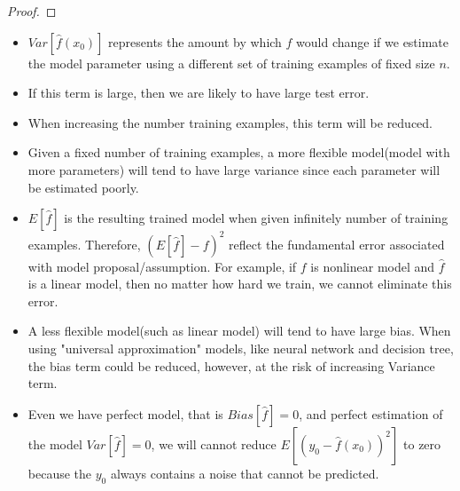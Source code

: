 \begin{refsection}
\begin{proof}
\end{proof}



\begin{remark}\hfill
\begin{itemize}
	\item $Var[\hat{f}(x_0)]$ represents the amount by which $\hat{f}$ would change if we estimate the model parameter using a different set of training examples of fixed size $n$. 
	\item If this term is large, then we are likely to have large test error.
	\item When increasing the number training examples, this term will be reduced. 
	\item Given a fixed number of training examples, a more flexible model(model with more parameters) will tend to have large variance since each parameter will be estimated poorly.
\end{itemize}
\end{remark}

\begin{remark}\hfill
	\begin{itemize}
		\item $E[\hat{f}]$ is the resulting trained model when given infinitely number of training examples. Therefore, $(E[\hat{f}] - f)^2$ reflect the fundamental error associated with model proposal/assumption. For example, if $f$ is nonlinear model and $\hat{f}$ is a linear model, then no matter how hard we train, we cannot eliminate this error. 
		\item A less flexible model(such as linear model) will tend to have large bias. When using "universal approximation" models, like neural network and decision tree, the bias term could be reduced, however, at the risk of increasing Variance term.
	\end{itemize}
\end{remark}


\begin{remark}\hfill
	\begin{itemize}
		\item Even we have perfect model, that is $Bias[\hat{f}] = 0$, and perfect estimation of the model $Var[\hat{f}]=0$, we will cannot reduce 
		$E[(y_0 - \hat{f}(x_0))^2]$ to zero because the $y_0$ always contains a noise that cannot be predicted.
	\end{itemize}
\end{remark}


\end{refsection}
